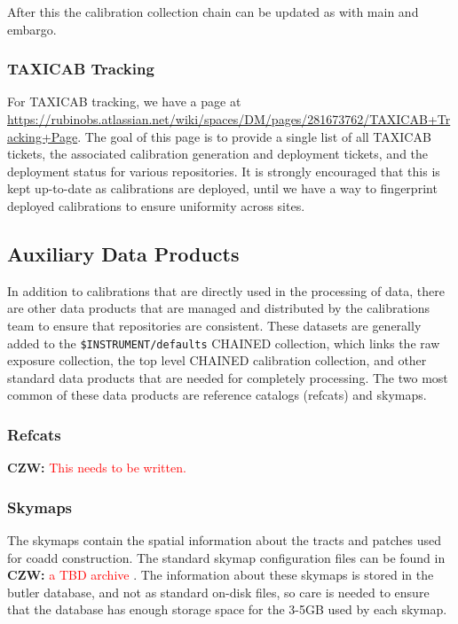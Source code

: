 \documentclass[DM,authoryear,toc]{lsstdoc}
\newcommand{\czw}[1]{
  \textbf{CZW: }\textcolor{red}{#1}
}
\begin{document}
After this the calibration collection chain can be updated as with main and embargo.

\subsubsection{TAXICAB Tracking}

For TAXICAB tracking, we have a page at \url{https://rubinobs.atlassian.net/wiki/spaces/DM/pages/281673762/TAXICAB+Tracking+Page}.
The goal of this page is to provide a single list of all TAXICAB tickets, the associated calibration generation and deployment tickets, and the deployment status for various repositories.
It is strongly encouraged that this is kept up-to-date as calibrations are deployed, until we have a way to fingerprint deployed calibrations to ensure uniformity across sites.

\subsection{Auxiliary Data Products}

In addition to calibrations that are directly used in the processing of data, there are other data products that are managed and distributed by the calibrations team to ensure that repositories are consistent.
These datasets are generally added to the \verb|$INSTRUMENT/defaults| CHAINED collection, which links the raw exposure collection, the top level CHAINED calibration collection, and other standard data products that are needed for completely processing.
The two most common of these data products are reference catalogs (refcats) and skymaps.

\subsubsection{Refcats}

\czw{This needs to be written.}

\subsubsection{Skymaps}

The skymaps contain the spatial information about the tracts and patches used for coadd construction.
The standard skymap configuration files can be found in \czw{a TBD archive}.
The information about these skymaps is stored in the butler database, and not as standard on-disk files, so care is needed to ensure that the database has enough storage space for the 3-5GB used by each skymap.
\end{document}
